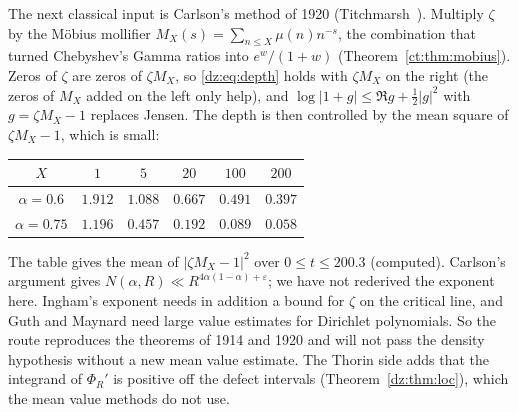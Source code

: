 The next classical input is Carlson's method of 1920 (Titchmarsh~\cite[Chapter 9]{Titchmarsh}). Multiply $\zeta$ by the M\"obius mollifier $M_X(s)=\sum_{n\le X}\mu(n)n^{-s}$, the combination that turned Chebyshev's Gamma ratios into $e^w/(1+w)$ (Theorem~\ref{ct:thm:mobius}). Zeros of $\zeta$ are zeros of $\zeta M_X$, so \eqref{dz:eq:depth} holds with $\zeta M_X$ on the right (the zeros of $M_X$ added on the left only help), and $\log|1+g|\le\Re g+\frac12|g|^2$ with $g=\zeta M_X-1$ replaces Jensen. The depth is then controlled by the mean square of $\zeta M_X-1$, which is small:
\begin{center}
\small
\begin{tabular}{@{}cccccc@{}}
\toprule
$X$ & $1$ & $5$ & $20$ & $100$ & $200$\\
\midrule
$\alpha=0.6$ & $1.912$ & $1.088$ & $0.667$ & $0.491$ & $0.397$\\
$\alpha=0.75$ & $1.196$ & $0.457$ & $0.192$ & $0.089$ & $0.058$\\
\bottomrule
\end{tabular}
\end{center}
The table gives the mean of $|\zeta M_X-1|^2$ over $0\le t\le200.3$ (computed). Carlson's argument gives $N(\alpha,R)\ll R^{4\alpha(1-\alpha)+\varepsilon}$; we have not rederived the exponent here. Ingham's exponent needs in addition a bound for $\zeta$ on the critical line, and Guth and Maynard \cite{GM26} need large value estimates for Dirichlet polynomials. So the route reproduces the theorems of 1914 and 1920 and will not pass the density hypothesis without a new mean value estimate. The Thorin side adds that the integrand of $\Phi_R'$ is positive off the defect intervals (Theorem~\ref{dz:thm:loc}), which the mean value methods do not use.

